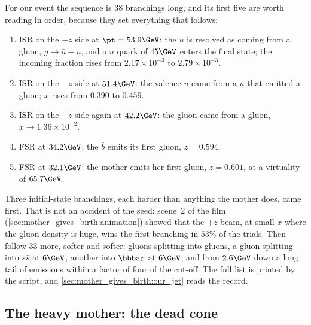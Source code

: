 For our event the sequence is 38 branchings long, and its first five are
worth reading in order, because they set everything that follows:
\begin{enumerate}[nosep]
  \item ISR on the $+z$ side at $\pt=53.9\GeV$: the $\bar u$ is resolved as
    coming from a gluon, $g\to\bar u+u$, and a $u$ quark of $45\GeV$ enters
    the final state; the incoming fraction rises from $2.17\times10^{-3}$ to
    $2.79\times10^{-3}$.
  \item ISR on the $-z$ side at $51.4\GeV$: the valence $u$ came from a $u$
    that emitted a gluon; $x$ rises from $0.390$ to $0.459$.
  \item ISR on the $+z$ side again at $42.2\GeV$: the gluon came from a
    gluon, $x\to1.36\times10^{-2}$.
  \item FSR at $34.2\GeV$: the $\bar b$ emits its first gluon, $z=0.594$.
  \item FSR at $32.1\GeV$: the mother emits her first gluon, $z=0.601$, at a
    virtuality of $65.7\GeV$.
\end{enumerate}
Three initial-state branchings, each harder than anything the mother does,
came first. That is not an accident of the seed: scene~2 of the film
(\cref{sec:mother_gives_birth:animation}) showed that the $+z$ beam, at small
$x$ where the gluon density is huge, wins the first branching in $53\%$ of
the trials. Then follow 33 more, softer and softer: gluons splitting into
gluons, a gluon splitting into $s\bar s$ at $6\GeV$, another into
$\bbbar$ at $6\GeV$, and from $2.6\GeV$ down a long tail of emissions
within a factor of four of the cut-off. The full list is printed by the
script, and \cref{sec:mother_gives_birth:our_jet} reads the record.

\subsection{The heavy mother: the dead cone}
\label{sec:mother_gives_birth:dead_cone}

